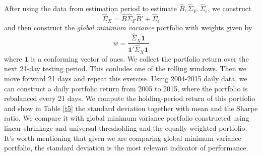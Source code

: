 After using the data from estimation period to estimate \(\hat{B} ,\hat{\Sigma}_{F}, \hat{\Sigma}_{\epsilon}\), we construct 
\begin{equation*}
    \hat{\Sigma}_{X} = \hat{B} \hat{\Sigma}_{F} \hat{B}' + \hat{\Sigma}_{\epsilon} 
\end{equation*}
and then construct the \textit{global minimum variance} portfolio with weights given by 
\begin{equation*}
    w = \frac{\hat{\Sigma}_{X} \mathbf{1}}{\mathbf{1}' \hat{\Sigma}_{X} \mathbf{1}}
\end{equation*}
where \(\mathbf{1}\) is a conforming vector of ones. We collect the portfolio return over the next 21-day testing period. This conludes one of the rolling windows. Then we move forward 21 days and repeat this exercise. Using 2004-2015 daily data, we can construct a daily portfolio return from 2005 to 2015, where the portfolio is rebalanced every 21 days. We compute the holding-period return of this portfolio and show in Table \ref{t5} the standard deviation together with mean and the Sharpe ratio. We compare it with global minimum variance portfolio constructed using linear shrinkage and universal thresholding and the equally weighted portfolio. It's worth mentioning that given we are comparing global minimum variance portfolio, the standard deviation is the most relevant indicator of performance.  





